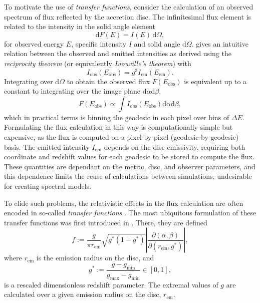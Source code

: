 \documentclass[fleqn,usenatbib]{mnras}
\renewcommand{\d}{\text{d}}
\newcommand{\jacobian}[2]{\left\lvert \frac{\partial #1}{\partial #2} \right\rvert}
\begin{document}
To motivate the use of \emph{transfer functions}, consider the calculation of an
observed spectrum of flux reflected by the accretion disc. The infinitesimal
flux element is related to the intensity in the solid angle element
\begin{equation}
\label{eq:infinitesimal-flux}
\d F(E) = I(E)\, \d \Omega,
\end{equation}
for observed energy $E$, specific intensity $I$ and solid angle $\d \Omega$.
\cite{ingram_public_2019} gives an intuitive relation between the observed
and emitted intensities as derived using the \emph{reciprocity theorem} (or
equivalently \emph{Liouville's theorem}) with
\begin{equation}
\label{eq:liouville-theorem}
I_\text{obs}\left( E_\text{obs}\right) = g^3 I_\text{em}\left(E_\text{em}\right).
\end{equation}
Integrating over $\d \Omega$ to obtain the observed flux $F(E_\text{obs})$ is
equivalent up to a constant to integrating over the image plane $\d \alpha \d
\beta$,
\begin{equation}
\label{eq:integrate-impact-params}
F(E_\text{obs}) \propto \int I_\text{obs}(E_\text{obs}) \d \alpha \d \beta,
\end{equation}
which in practical terms is binning the geodesic in each pixel over bins of
$\Delta E$.  Formulating the flux calculation in this way is computationally
simple but expensive, as the flux is computed on a pixel-by-pixel
(geodesic-by-geodesic) basis. The emitted intensity $I_\text{em}$ depends on the
disc emissivity, requiring both coordinate and redshift values for each geodesic
to be stored to compute the flux. These quantities are dependant on the metric,
disc, and observer parameters, and this dependence limits the reuse of
calculations between simulations, undesirable for creating spectral models.

To elide such problems, the relativistic effects in the flux calculation are
often encoded in so-called \emph{transfer functions}
\citep{brenneman_constraining_2006}. The most ubiquitous formulation of these
transfer functions was first introduced in \cite{cunningham_effects_1975}.
There, they are defined
\begin{equation}
    \label{eq:cunn-transfer-function}
    f:=\frac{g}{\pi r_\text{em}} \sqrt{g^\ast(1 - g^\ast)} \jacobian{(\alpha, \beta)}{(r_\text{em}, g^\ast)},
\end{equation}
where $r_\text{em}$ is the emission radius on the disc, and
\begin{equation}
    g^\ast := \frac{g - g_\text{min}}{g_\text{max} - g_\text{min}} \in [0, 1],
\end{equation}
is a rescaled dimensionless redshift parameter. The extremal values of $g$ are
calculated over a given emission radius on the disc, $r_\text{em}$.
\end{document}

